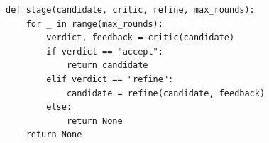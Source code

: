 
\begin{listing}
\caption{\textbf{Python-style pseudocode for each pipeline stage.} At each stage, \sname~evaluates candidate artifacts using a critic agent. If accepted, the artifact is
returned; if rejected, it is discarded; otherwise, it is iteratively refined based on the critic's feedback up to a maximum number of rounds.}\label{lst:stage_pseudocode}
\begin{lstlisting}[style=pseudopython]
def stage(candidate, critic, refine, max_rounds):
    for _ in range(max_rounds):
        verdict, feedback = critic(candidate)
        if verdict == "accept":
            return candidate
        elif verdict == "refine":
            candidate = refine(candidate, feedback)
        else:
            return None
    return None
\end{lstlisting}
\end{listing}